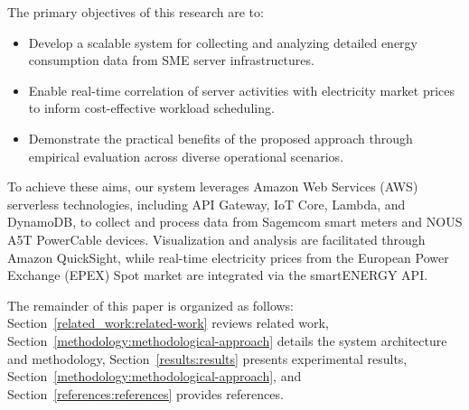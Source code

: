 The primary objectives of this research are to:
\begin{itemize}
\item Develop a scalable system for collecting and analyzing detailed energy consumption data from SME server infrastructures.
\item Enable real-time correlation of server activities with electricity market prices to inform cost-effective workload scheduling.
\item Demonstrate the practical benefits of the proposed approach through empirical evaluation across diverse operational scenarios.
\end{itemize}
To achieve these aims, our system leverages Amazon Web Services (AWS) serverless technologies, including API Gateway, IoT Core, Lambda, and DynamoDB, to collect and process data from Sagemcom smart meters and NOUS A5T PowerCable devices. Visualization and analysis are facilitated through Amazon QuickSight, while real-time electricity prices from the European Power Exchange (EPEX) Spot market are integrated via the smartENERGY API.

The remainder of this paper is organized as follows: Section~\ref{related_work:related-work} reviews related work, Section~\ref{methodology:methodological-approach} details the system architecture and methodology, Section~\ref{results:results} presents experimental results, Section~\ref{methodology:methodological-approach}, and Section~\ref{references:references} provides references.